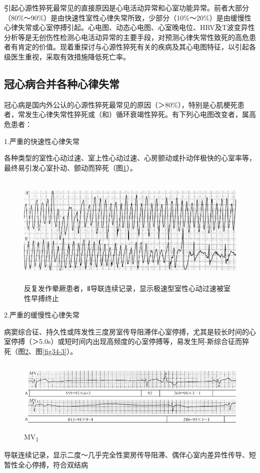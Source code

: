 引起心源性猝死最常见的直接原因是心电活动异常和心室功能异常。前者大部分（80\%～90\%）是由快速性室性心律失常所致，少部分（10\%～20\%）是由缓慢性心律失常或心室停搏引起。心电图、动态心电图、心室晚电位、HRV及T波变异性分析等是无创伤性检测心电活动异常的主要手段，对预测心律失常性致死的高危患者有肯定的价值。现着重探讨与心源性猝死有关的疾病及其心电图特征，以引起各级医生重视，采取有效措施降低死亡率。

\protect\hypertarget{text00041.htmlux5cux23subid449}{}{}

\subsection{冠心病合并各种心律失常}

冠心病是国内外公认的心源性猝死最常见的原因（＞80\%），特别是心肌梗死患者，常发生心律失常性猝死或（和）循环衰竭性猝死。有下列心电图改变者，属高危患者：

1.严重的快速性心律失常

各种类型的室性心动过速、室上性心动过速、心房颤动或扑动伴极快的心室率等，最终易引发心室扑动、颤动而猝死（图\ref{fig34-1}）。

\begin{figure}[!htbp]
 \centering
 \includegraphics[width=5.58333in,height=2.11458in]{./images/Image00541.jpg}
 \captionsetup{justification=centering}
 \caption{反复发作晕厥患者，Ⅱ导联连续记录，显示极速型室性心动过速被室性早搏终止}
 \label{fig34-1}
  \end{figure} 

2.严重的缓慢性心律失常

病窦综合征、持久性或阵发性三度房室传导阻滞伴心室停搏，尤其是较长时间的心室停搏（＞5.0s）或短时间内出现高频度的心室停搏等，易发生阿-斯综合征而猝死（图\ref{fig34-2}、图\ref{fig34-3}）。

\begin{figure}[!htbp]
 \centering
 \includegraphics[width=5.69792in,height=1.38542in]{./images/Image00542.jpg}
 \captionsetup{justification=centering}
 \caption{MV\textsubscript{1}}
 \label{fig34-2}
  \end{figure} 
导联连续记录，显示二度～几乎完全性窦房传导阻滞、偶伴心室内差异性传导、短暂性全心停搏，符合双结病

